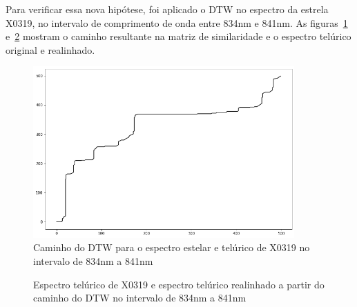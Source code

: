 Para verificar essa nova hipótese, foi aplicado o DTW no espectro da estrela X0319, no intervalo de comprimento de onda entre 834nm e 841nm. As figuras~\ref{fig:x0319-warp-path-zoom} e~\ref{fig:x0319-realigned-telluric-zoom} mostram o caminho resultante na matriz de similaridade e o espectro telúrico original e realinhado. 
\begin{figure}[htb]
\centering
\includegraphics[width=10cm]{figuras/x0319_warp_path_zoom.png}
\caption{Caminho do DTW para o espectro estelar e telúrico de X0319 no intervalo de 834nm a 841nm}
\label{fig:x0319-warp-path-zoom}
\end{figure}

\begin{figure}[H]
  \centering
  \hfill
  \caption{Espectro telúrico de X0319 e espectro telúrico realinhado a partir do caminho do DTW no intervalo de 834nm a 841nm}
  \label{fig:x0319-realigned-telluric-zoom}
\end{figure}


